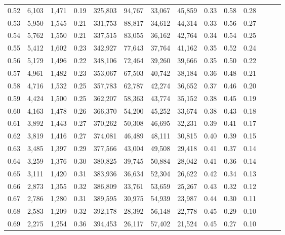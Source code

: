\begin{tabular}{rrrrrrrrrrrrrr}
0.52 &   6,103 &  1,471 &  0.19 &  325,803 &   94,767 &  33,067 &  45,859 &  0.33 &  0.58 &      0.28 \\
0.53 &   5,950 &  1,545 &  0.21 &  331,753 &   88,817 &  34,612 &  44,314 &  0.33 &  0.56 &      0.27 \\
0.54 &   5,762 &  1,550 &  0.21 &  337,515 &   83,055 &  36,162 &  42,764 &  0.34 &  0.54 &      0.25 \\
0.55 &   5,412 &  1,602 &  0.23 &  342,927 &   77,643 &  37,764 &  41,162 &  0.35 &  0.52 &      0.24 \\
0.56 &   5,179 &  1,496 &  0.22 &  348,106 &   72,464 &  39,260 &  39,666 &  0.35 &  0.50 &      0.22 \\
0.57 &   4,961 &  1,482 &  0.23 &  353,067 &   67,503 &  40,742 &  38,184 &  0.36 &  0.48 &      0.21 \\
0.58 &   4,716 &  1,532 &  0.25 &  357,783 &   62,787 &  42,274 &  36,652 &  0.37 &  0.46 &      0.20 \\
0.59 &   4,424 &  1,500 &  0.25 &  362,207 &   58,363 &  43,774 &  35,152 &  0.38 &  0.45 &      0.19 \\
0.60 &   4,163 &  1,478 &  0.26 &  366,370 &   54,200 &  45,252 &  33,674 &  0.38 &  0.43 &      0.18 \\
0.61 &   3,892 &  1,443 &  0.27 &  370,262 &   50,308 &  46,695 &  32,231 &  0.39 &  0.41 &      0.17 \\
0.62 &   3,819 &  1,416 &  0.27 &  374,081 &   46,489 &  48,111 &  30,815 &  0.40 &  0.39 &      0.15 \\
0.63 &   3,485 &  1,397 &  0.29 &  377,566 &   43,004 &  49,508 &  29,418 &  0.41 &  0.37 &      0.14 \\
0.64 &   3,259 &  1,376 &  0.30 &  380,825 &   39,745 &  50,884 &  28,042 &  0.41 &  0.36 &      0.14 \\
0.65 &   3,111 &  1,420 &  0.31 &  383,936 &   36,634 &  52,304 &  26,622 &  0.42 &  0.34 &      0.13 \\
0.66 &   2,873 &  1,355 &  0.32 &  386,809 &   33,761 &  53,659 &  25,267 &  0.43 &  0.32 &      0.12 \\
0.67 &   2,786 &  1,280 &  0.31 &  389,595 &   30,975 &  54,939 &  23,987 &  0.44 &  0.30 &      0.11 \\
0.68 &   2,583 &  1,209 &  0.32 &  392,178 &   28,392 &  56,148 &  22,778 &  0.45 &  0.29 &      0.10 \\
0.69 &   2,275 &  1,254 &  0.36 &  394,453 &   26,117 &  57,402 &  21,524 &  0.45 &  0.27 &      0.10 \\

\end{tabular}
